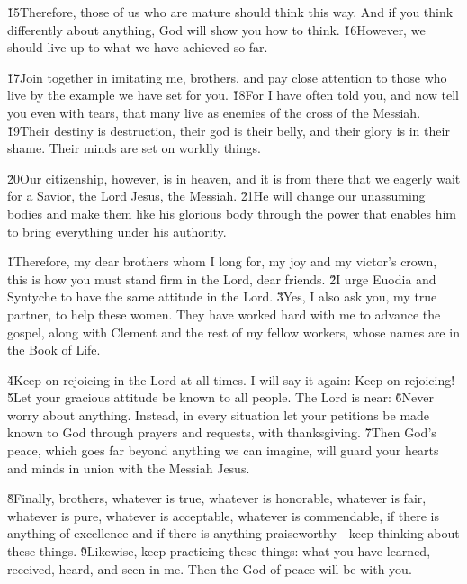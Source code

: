 \v{15}Therefore, those of us who are mature should think this way. And if you think differently about anything, God will show you how to think. \v{16}However, we should live up to what we have achieved so far.

\v{17}Join together in imitating me, brothers, and pay close attention to those who live by the example we have set for you. \v{18}For I have often told you, and now tell you even with tears, that many live as enemies of the cross of the Messiah. \v{19}Their destiny is destruction, their god is their belly, and their glory is in their shame. Their minds are set on worldly things.

\v{20}Our citizenship, however, is in heaven, and it is from there that we eagerly wait for a Savior, the Lord Jesus, the Messiah. \v{21}He will change our unassuming bodies and make them like his glorious body through the power that enables him to bring everything under his authority.

\v{1}Therefore, my dear brothers whom I long for, my joy and my victor's crown, this is how you must stand firm in the Lord, dear friends. \v{2}I urge Euodia and Syntyche to have the same attitude in the Lord. \v{3}Yes, I also ask you, my true partner, to help these women. They have worked hard with me to advance the gospel, along with Clement and the rest of my fellow workers, whose names are in the Book of Life.

\v{4}Keep on rejoicing in the Lord at all times. I will say it again: Keep on rejoicing! \v{5}Let your gracious attitude be known to all people. The Lord is near: \v{6}Never worry about anything. Instead, in every situation let your petitions be made known to God through prayers and requests, with thanksgiving. \v{7}Then God's peace, which goes far beyond anything we can imagine, will guard your hearts and minds in union with the Messiah Jesus.

\v{8}Finally, brothers, whatever is true, whatever is honorable, whatever is fair, whatever is pure, whatever is acceptable, whatever is commendable, if there is anything of excellence and if there is anything praiseworthy---keep thinking about these things. \v{9}Likewise, keep practicing these things: what you have learned, received, heard, and seen in me. Then the God of peace will be with you.

